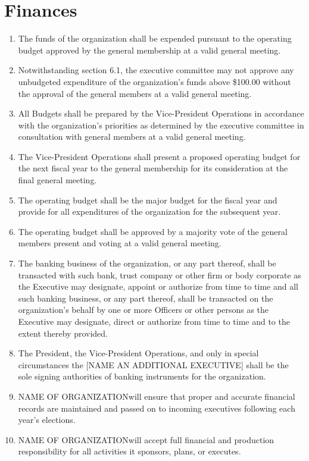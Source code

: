\documentclass[12pt]{article}
\newcommand{\orgname}{NAME OF ORGANIZATION\space}
\begin{document}
\section{Finances}
\begin{enumerate}[{6}.1]
    \item The funds of the organization shall be expended pursuant to the operating budget approved by the general membership at a valid general meeting. 
    \item Notwithstanding section 6.1, the executive committee may not approve any unbudgeted expenditure of the organization’s funds above \$100.00 without the approval of the general members at a valid general meeting. 
    \item All Budgets shall be prepared by the Vice-President Operations in accordance with the organization’s priorities as determined by the executive committee in consultation with general members at a valid general meeting. 
    \item The Vice-President Operations shall present a proposed operating budget for the next fiscal year to the general membership for its consideration at the final general meeting. 
    \item The operating budget shall be the major budget for the fiscal year and provide for all expenditures of the organization for the subsequent year.
    \item The operating budget shall be approved by a majority vote of the general members present and voting at a valid general meeting. 
    \item The banking business of the organization, or any part thereof, shall be transacted with such bank, trust company or other firm or body corporate as the Executive may designate, appoint or authorize from time to time and all such banking business, or any part thereof, shall be transacted on the organization's behalf by one or more Officers or other persons as the Executive may designate, direct or authorize from time to time and to the extent thereby provided.
    \item The President, the Vice-President Operations, and only in special circumstances the [NAME AN ADDITIONAL EXECUTIVE] shall be the sole signing authorities of banking instruments for the organization.  
    \item \orgname will ensure that proper and accurate financial records are maintained and passed on to incoming executives following each year’s elections.
    \item	\orgname will accept full financial and production responsibility for all activities it sponsors, plans, or executes.
\end{enumerate}
\end{document}
